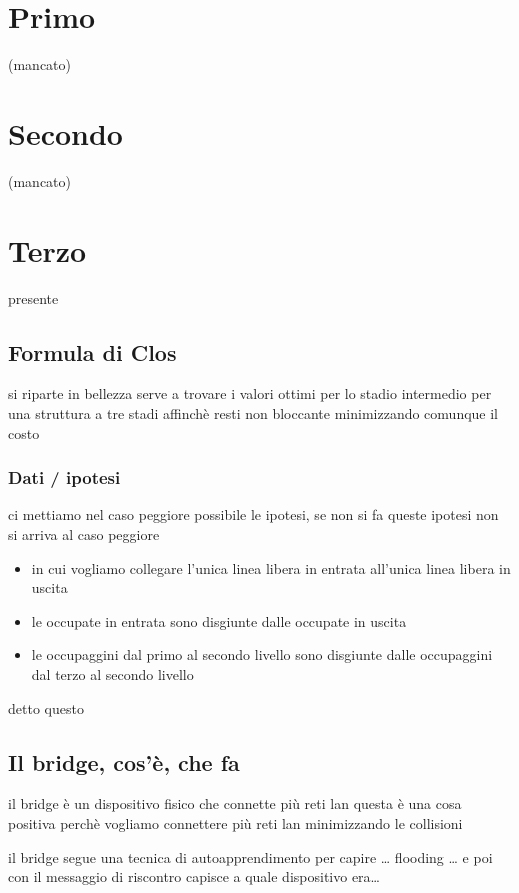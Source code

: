 \documentclass[11pt]{article}
\author{Biggie Dickus}
\date{\today}
\title{}
\begin{document}
\tableofcontents

\section{Primo}
\label{sec:org10a90a5}
(mancato)

\section{Secondo}
\label{sec:org98a0ee8}
(mancato)

\section{Terzo}
\label{sec:orgec51d2b}
presente
\subsection{Formula di Clos}
\label{sec:org9cec5f1}
si riparte in bellezza
serve a trovare i valori ottimi per lo stadio intermedio per una struttura a tre stadi affinchè resti non bloccante minimizzando comunque il costo

\subsubsection{Dati / ipotesi}
\label{sec:org7a51379}
ci mettiamo nel caso peggiore possibile
le ipotesi, se non si fa queste ipotesi non si arriva al caso peggiore
\begin{itemize}
\item in cui vogliamo collegare l'unica linea libera in entrata all'unica linea libera in uscita
\item le occupate in entrata sono disgiunte dalle occupate in uscita
\item le occupaggini dal primo al secondo livello sono disgiunte dalle occupaggini dal terzo al secondo livello
\end{itemize}

detto questo

\subsection{Il bridge, cos'è, che fa}
\label{sec:org76895ce}
il bridge è un dispositivo fisico che connette più reti lan
questa è una cosa positiva perchè vogliamo connettere più reti lan minimizzando le collisioni

il bridge segue una tecnica di autoapprendimento per capire \ldots{}
flooding \ldots{}
e poi con il messaggio di riscontro capisce a quale dispositivo era\ldots{}
\end{document}
